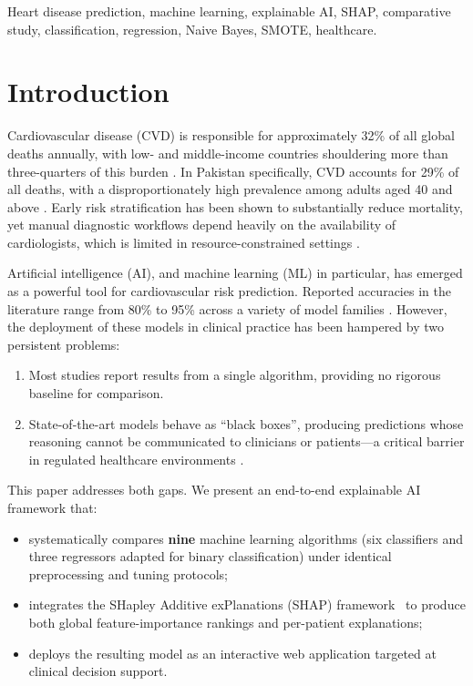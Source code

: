 \documentclass[conference]{IEEEtran}
\begin{document}
\begin{IEEEkeywords}
Heart disease prediction, machine learning, explainable AI, SHAP, comparative study, classification, regression, Naive Bayes, SMOTE, healthcare.
\end{IEEEkeywords}

\section{Introduction}
Cardiovascular disease (CVD) is responsible for approximately 32\% of all global deaths annually, with low- and middle-income countries shouldering more than three-quarters of this burden \cite{who2021cvd}. In Pakistan specifically, CVD accounts for 29\% of all deaths, with a disproportionately high prevalence among adults aged 40 and above \cite{jafar2018cardiovascular}. Early risk stratification has been shown to substantially reduce mortality, yet manual diagnostic workflows depend heavily on the availability of cardiologists, which is limited in resource-constrained settings \cite{krittanawong2020ml}.

Artificial intelligence (AI), and machine learning (ML) in particular, has emerged as a powerful tool for cardiovascular risk prediction. Reported accuracies in the literature range from 80\% to 95\% across a variety of model families \cite{ahsan2022machine, mienye2024deep}. However, the deployment of these models in clinical practice has been hampered by two persistent problems:
\begin{enumerate}
    \item Most studies report results from a single algorithm, providing no rigorous baseline for comparison.
    \item State-of-the-art models behave as ``black boxes'', producing predictions whose reasoning cannot be communicated to clinicians or patients---a critical barrier in regulated healthcare environments \cite{tjoa2021survey}.
\end{enumerate}

This paper addresses both gaps. We present an end-to-end explainable AI framework that:
\begin{itemize}
    \item systematically compares \textbf{nine} machine learning algorithms (six classifiers and three regressors adapted for binary classification) under identical preprocessing and tuning protocols;
    \item integrates the SHapley Additive exPlanations (SHAP) framework~\cite{lundberg2017unified} to produce both global feature-importance rankings and per-patient explanations;
    \item deploys the resulting model as an interactive web application targeted at clinical decision support.
\end{itemize}
\end{document}
